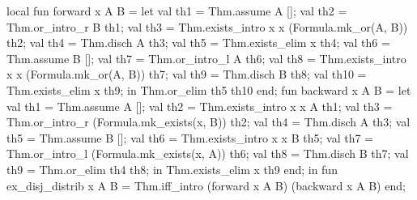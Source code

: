 \nwenddocs{}\plusendmoddef\nwstartdeflinemarkup{}\nwenddeflinemarkup
local
  fun forward x A B =
    let
      val th1 = Thm.assume A [];
      val th2 = Thm.or_intro_r B th1;
      val th3 = Thm.exists_intro x x (Formula.mk_or(A, B))
                                 th2;
      val th4 = Thm.disch A th3;
      val th5 = Thm.exists_elim x th4;
      val th6 = Thm.assume B [];
      val th7 = Thm.or_intro_l A th6;
      val th8 = Thm.exists_intro x x (Formula.mk_or(A, B)) th7;
      val th9 = Thm.disch B th8;
      val th10 = Thm.exists_elim x th9;
    in
      Thm.or_elim th5 th10
    end;
  fun backward x A B =
    let
      val th1 = Thm.assume A [];
      val th2 = Thm.exists_intro x x A th1;
      val th3 = Thm.or_intro_r (Formula.mk_exists(x, B)) th2;
      val th4 = Thm.disch A th3;
      val th5 = Thm.assume B [];
      val th6 = Thm.exists_intro x x B th5;
      val th7 = Thm.or_intro_l (Formula.mk_exists(x, A)) th6;
      val th8 = Thm.disch B th7;
      val th9 = Thm.or_elim th4 th8;
    in
      Thm.exists_elim x th9
    end;
in
fun ex_disj_distrib x A B =
  Thm.iff_intro (forward x A B) (backward x A B)
end;
\eatline
